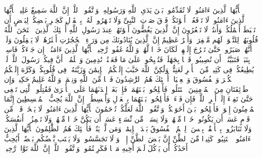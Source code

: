 \stopbuffer
\startbuffer[\q:49:1]
یَٰۤأَیُّهَا ٱلَّذِینَ ءَامَنُوا۟ لَا تُقَدِّمُوا۟ بَیۡنَ یَدَیِ ٱللَّهِ وَرَسُولِهِۦۖ وَٱتَّقُوا۟ ٱللَّهَۚ إِنَّ ٱللَّهَ سَمِیعٌ عَلِیمࣱ%
\stopbuffer
\startbuffer[\q:49:2]
یَٰۤأَیُّهَا ٱلَّذِینَ ءَامَنُوا۟ لَا تَرۡفَعُوۤا۟ أَصۡوَٰتَكُمۡ فَوۡقَ صَوۡتِ ٱلنَّبِیِّ وَلَا تَجۡهَرُوا۟ لَهُۥ بِٱلۡقَوۡلِ كَجَهۡرِ بَعۡضِكُمۡ لِبَعۡضٍ أَن تَحۡبَطَ أَعۡمَٰلُكُمۡ وَأَنتُمۡ لَا تَشۡعُرُونَ%
\stopbuffer
\startbuffer[\q:49:3]
إِنَّ ٱلَّذِینَ یَغُضُّونَ أَصۡوَٰتَهُمۡ عِندَ رَسُولِ ٱللَّهِ أُو۟لَٰۤئِكَ ٱلَّذِینَ ٱمۡتَحَنَ ٱللَّهُ قُلُوبَهُمۡ لِلتَّقۡوَىٰۚ لَهُم مَّغۡفِرَةࣱ وَأَجۡرٌ عَظِیمٌ%
\stopbuffer
\startbuffer[\q:49:4]
إِنَّ ٱلَّذِینَ یُنَادُونَكَ مِن وَرَاۤءِ ٱلۡحُجُرَٰتِ أَكۡثَرُهُمۡ لَا یَعۡقِلُونَ%
\stopbuffer
\startbuffer[\q:49:5]
وَلَوۡ أَنَّهُمۡ صَبَرُوا۟ حَتَّىٰ تَخۡرُجَ إِلَیۡهِمۡ لَكَانَ خَیۡرࣰا لَّهُمۡۚ وَٱللَّهُ غَفُورࣱ رَّحِیمࣱ%
\stopbuffer
\startbuffer[\q:49:6]
یَٰۤأَیُّهَا ٱلَّذِینَ ءَامَنُوۤا۟ إِن جَاۤءَكُمۡ فَاسِقُۢ بِنَبَإࣲ فَتَبَیَّنُوۤا۟ أَن تُصِیبُوا۟ قَوۡمَۢا بِجَهَٰلَةࣲ فَتُصۡبِحُوا۟ عَلَىٰ مَا فَعَلۡتُمۡ نَٰدِمِینَ%
\stopbuffer
\startbuffer[\q:49:7]
وَٱعۡلَمُوۤا۟ أَنَّ فِیكُمۡ رَسُولَ ٱللَّهِۚ لَوۡ یُطِیعُكُمۡ فِی كَثِیرࣲ مِّنَ ٱلۡأَمۡرِ لَعَنِتُّمۡ وَلَٰكِنَّ ٱللَّهَ حَبَّبَ إِلَیۡكُمُ ٱلۡإِیمَٰنَ وَزَیَّنَهُۥ فِی قُلُوبِكُمۡ وَكَرَّهَ إِلَیۡكُمُ ٱلۡكُفۡرَ وَٱلۡفُسُوقَ وَٱلۡعِصۡیَانَۚ أُو۟لَٰۤئِكَ هُمُ ٱلرَّٰشِدُونَ%
\stopbuffer
\startbuffer[\q:49:8]
فَضۡلࣰا مِّنَ ٱللَّهِ وَنِعۡمَةࣰۚ وَٱللَّهُ عَلِیمٌ حَكِیمࣱ%
\stopbuffer
\startbuffer[\q:49:9]
وَإِن طَاۤئِفَتَانِ مِنَ ٱلۡمُؤۡمِنِینَ ٱقۡتَتَلُوا۟ فَأَصۡلِحُوا۟ بَیۡنَهُمَاۖ فَإِنۢ بَغَتۡ إِحۡدَىٰهُمَا عَلَى ٱلۡأُخۡرَىٰ فَقَٰتِلُوا۟ ٱلَّتِی تَبۡغِی حَتَّىٰ تَفِیۤءَ إِلَىٰۤ أَمۡرِ ٱللَّهِۚ فَإِن فَاۤءَتۡ فَأَصۡلِحُوا۟ بَیۡنَهُمَا بِٱلۡعَدۡلِ وَأَقۡسِطُوۤا۟ۖ إِنَّ ٱللَّهَ یُحِبُّ ٱلۡمُقۡسِطِینَ%
\stopbuffer
\startbuffer[\q:49:10]
إِنَّمَا ٱلۡمُؤۡمِنُونَ إِخۡوَةࣱ فَأَصۡلِحُوا۟ بَیۡنَ أَخَوَیۡكُمۡۚ وَٱتَّقُوا۟ ٱللَّهَ لَعَلَّكُمۡ تُرۡحَمُونَ%
\stopbuffer
\startbuffer[\q:49:11]
یَٰۤأَیُّهَا ٱلَّذِینَ ءَامَنُوا۟ لَا یَسۡخَرۡ قَوۡمࣱ مِّن قَوۡمٍ عَسَىٰۤ أَن یَكُونُوا۟ خَیۡرࣰا مِّنۡهُمۡ وَلَا نِسَاۤءࣱ مِّن نِّسَاۤءٍ عَسَىٰۤ أَن یَكُنَّ خَیۡرࣰا مِّنۡهُنَّۖ وَلَا تَلۡمِزُوۤا۟ أَنفُسَكُمۡ وَلَا تَنَابَزُوا۟ بِٱلۡأَلۡقَٰبِۖ بِئۡسَ ٱلِٱسۡمُ ٱلۡفُسُوقُ بَعۡدَ ٱلۡإِیمَٰنِۚ وَمَن لَّمۡ یَتُبۡ فَأُو۟لَٰۤئِكَ هُمُ ٱلظَّٰلِمُونَ%
\stopbuffer
\startbuffer[\q:49:12]
یَٰۤأَیُّهَا ٱلَّذِینَ ءَامَنُوا۟ ٱجۡتَنِبُوا۟ كَثِیرࣰا مِّنَ ٱلظَّنِّ إِنَّ بَعۡضَ ٱلظَّنِّ إِثۡمࣱۖ وَ لَا تَجَسَّسُوا۟ وَلَا یَغۡتَب بَّعۡضُكُم بَعۡضًاۚ أَیُحِبُّ أَحَدُكُمۡ أَن یَأۡكُلَ لَحۡمَ أَخِیهِ مَیۡتࣰا فَكَرِهۡتُمُوهُۚ وَٱتَّقُوا۟ ٱللَّهَۚ إِنَّ ٱللَّهَ تَوَّابࣱ رَّحِیمࣱ%
